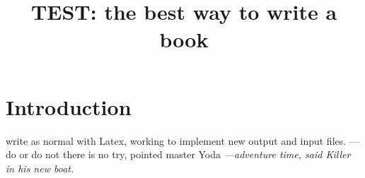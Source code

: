 \documentclass[16pt]{book}
\title{TEST: the best way to write a book}
\begin{document}
\maketitle

\chapter{Introduction}
write as normal with Latex, working to implement new output and input files.
---do or do not there is no try, pointed master Yoda
\textit{
---adventure time, said Killer in his new boat.
}
\end{document}
